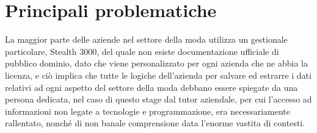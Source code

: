 \section{Principali problematiche}
La maggior parte delle aziende nel settore della moda utilizza un gestionale particolare, Stealth 3000, del quale non esiste documentazione ufficiale di pubblico dominio, dato che viene personalizzato per ogni azienda che ne abbia la licenza, e ciò implica che tutte le logiche dell'azienda per salvare ed estrarre i dati relativi ad ogni aspetto del settore della moda debbano essere spiegate da una persona dedicata, nel caso di questo stage dal tutor aziendale, per cui l'accesso ad informazioni non legate a tecnologie e programmazione, era necessariamente rallentato, nonché di non banale comprensione data l'enorme vastita di contesti.